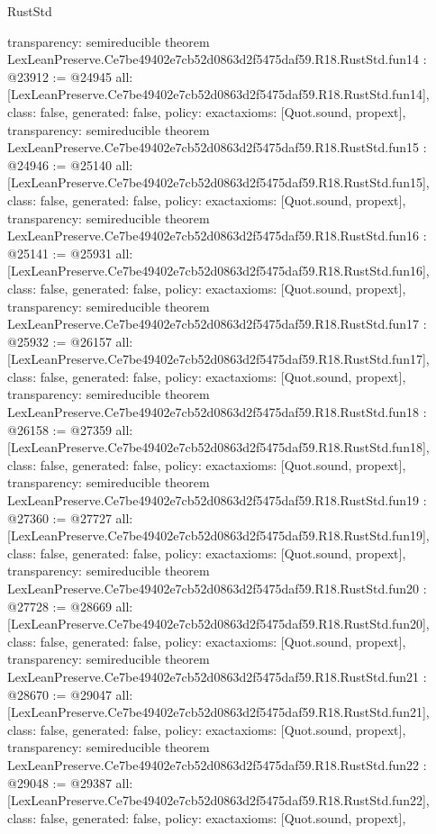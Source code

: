 \begin{lexlean}{RustStd}
\begin{coremodule}
{  transparency: semireducible
}
theorem LexLeanPreserve.Ce7be49402e7cb52d0863d2f5475daf59.R18.RustStd.fun14 : @23912 := @24945 {
  all: [LexLeanPreserve.Ce7be49402e7cb52d0863d2f5475daf59.R18.RustStd.fun14],
  class: false,
  generated: false,
  policy: exact{axioms: [Quot.sound, propext]},
  transparency: semireducible
}
theorem LexLeanPreserve.Ce7be49402e7cb52d0863d2f5475daf59.R18.RustStd.fun15 : @24946 := @25140 {
  all: [LexLeanPreserve.Ce7be49402e7cb52d0863d2f5475daf59.R18.RustStd.fun15],
  class: false,
  generated: false,
  policy: exact{axioms: [Quot.sound, propext]},
  transparency: semireducible
}
theorem LexLeanPreserve.Ce7be49402e7cb52d0863d2f5475daf59.R18.RustStd.fun16 : @25141 := @25931 {
  all: [LexLeanPreserve.Ce7be49402e7cb52d0863d2f5475daf59.R18.RustStd.fun16],
  class: false,
  generated: false,
  policy: exact{axioms: [Quot.sound, propext]},
  transparency: semireducible
}
theorem LexLeanPreserve.Ce7be49402e7cb52d0863d2f5475daf59.R18.RustStd.fun17 : @25932 := @26157 {
  all: [LexLeanPreserve.Ce7be49402e7cb52d0863d2f5475daf59.R18.RustStd.fun17],
  class: false,
  generated: false,
  policy: exact{axioms: [Quot.sound, propext]},
  transparency: semireducible
}
theorem LexLeanPreserve.Ce7be49402e7cb52d0863d2f5475daf59.R18.RustStd.fun18 : @26158 := @27359 {
  all: [LexLeanPreserve.Ce7be49402e7cb52d0863d2f5475daf59.R18.RustStd.fun18],
  class: false,
  generated: false,
  policy: exact{axioms: [Quot.sound, propext]},
  transparency: semireducible
}
theorem LexLeanPreserve.Ce7be49402e7cb52d0863d2f5475daf59.R18.RustStd.fun19 : @27360 := @27727 {
  all: [LexLeanPreserve.Ce7be49402e7cb52d0863d2f5475daf59.R18.RustStd.fun19],
  class: false,
  generated: false,
  policy: exact{axioms: [Quot.sound, propext]},
  transparency: semireducible
}
theorem LexLeanPreserve.Ce7be49402e7cb52d0863d2f5475daf59.R18.RustStd.fun20 : @27728 := @28669 {
  all: [LexLeanPreserve.Ce7be49402e7cb52d0863d2f5475daf59.R18.RustStd.fun20],
  class: false,
  generated: false,
  policy: exact{axioms: [Quot.sound, propext]},
  transparency: semireducible
}
theorem LexLeanPreserve.Ce7be49402e7cb52d0863d2f5475daf59.R18.RustStd.fun21 : @28670 := @29047 {
  all: [LexLeanPreserve.Ce7be49402e7cb52d0863d2f5475daf59.R18.RustStd.fun21],
  class: false,
  generated: false,
  policy: exact{axioms: [Quot.sound, propext]},
  transparency: semireducible
}
theorem LexLeanPreserve.Ce7be49402e7cb52d0863d2f5475daf59.R18.RustStd.fun22 : @29048 := @29387 {
  all: [LexLeanPreserve.Ce7be49402e7cb52d0863d2f5475daf59.R18.RustStd.fun22],
  class: false,
  generated: false,
  policy: exact{axioms: [Quot.sound, propext]},
}
\end{coremodule}
\end{lexlean}
